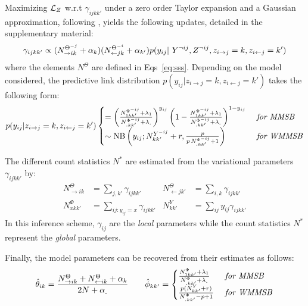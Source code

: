 Maximizing $\mathcal{L}_Z$ w.r.t $\gamma_{ijkk'}$ under a zero order Taylor expansion and a Gaussian approximation, following \cite{teh2006collapsed,asuncion2009smoothing}, yields the following updates, detailed in the supplementary material:
%
\begin{equation} \label{eq:maximization}
\gamma_{ijkk'} \propto (N_{\rightarrow ik}^{\Theta^{-j}} + \alpha_k) (N_{\leftarrow jk}^{\Theta^{-i}} + \alpha_{k'}) p(y_{ij} | Y^{\neg ij}, Z^{\neg ij}, \zij=k, \zji=k')
\end{equation}
%
where the elements $N^{\Theta}$ are defined in Eqs~\eqref{eq:sss}. Depending on the model considered, the predictive link distribution $p(y_{ij}|z_{i \rightarrow j}=k,z_{i \leftarrow j}=k')$ takes the following form:
%
\begin{align*}
p(y_{ij} | z_{i \rightarrow j} = k,z_{i \leftarrow j} = k') \begin{cases}
    = \left( \frac{ N^{\Phi^{-ij}}_{1 kk'} + \lambda_1}{N^{\Phi^{-ij}}_{\bm{.}kk'} + \lambda_{\bm{.}}}\right)^{y_{ij}} \left( 1- \frac{ N^{\Phi^{-ij}}_{1 kk'} + \lambda_1}{N^{\Phi^{-ij}}_{\bm{.}kk'} + \lambda_{\bm{.}}}\right)^{1-y_{ij}}  & \textrm{ \textit{for MMSB}} \\
    \sim \mathrm{NB}\left(y_{ij}; N^{Y^{-ij}}_{kk'} + r, \frac{p}{p\,N^{\Phi^{-ij}}_{\bm{.}kk'} + 1} \right) & \textrm{ \textit{for WMMSB}} %
\end{cases}
\end{align*}

The different count statistics $N^*$ are estimated from the variational parameters $\gamma_{ijkk'}$ by:
%
\begin{align} \label{eq:sss}
    N^{\Theta}_{\rightarrow ik} &= \sum_{j, k'} \gamma_{ijkk'}        & N^{\Theta}_{\leftarrow jk'} &= \sum_{i, k} \gamma_{ijkk'}  \nonumber \\
    N^{\Phi}_{xkk'} &= \sum_{ij:y_{ij}=x} \gamma_{ijkk'}  & N^{Y}_{kk'} &= \sum_{ij} y_{ij}\gamma_{ijkk'}
\end{align}
%
In this inference scheme, $\gamma_{ij}$ are the \emph{local} parameters while the count statistics $N^*$ represent the \emph{global} parameters.  

Finally, the model parameters can be recovered from their estimates as follows:
%
\begin{align*}
\hat \theta_{ik} = \frac{N^{\Theta}_{\rightarrow ik} + N^{\Theta}_{\leftarrow ik} + \alpha_k}{2N + \alpha_{\bm{.}}} \qquad 
\hat \phi_{kk'}=\begin{cases}
     \frac{N^{\Phi}_{1 kk'} + \lambda_1}{N^{\Phi}_{\bm{.}kk'} + \lambda_{\bm{.}}} & \textrm{ \textit{for MMSB}} \\
    \frac{p(N^Y_{kk'} + r)}{N^{\Phi}_{\bm{.}kk'} - p + 1}  & \textrm{ \textit{for WMMSB}}  %
    \end{cases}
\end{align*}

